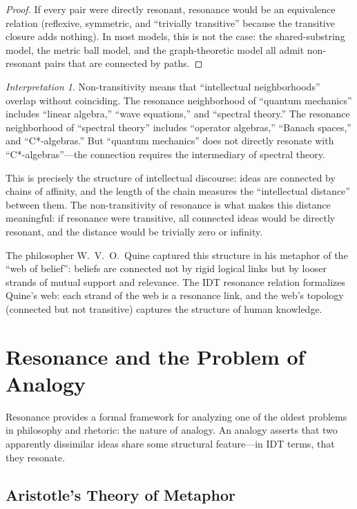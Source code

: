 \documentclass[11pt,openany]{book}
\theoremstyle{definition}
\theoremstyle{plain}
\theoremstyle{remark}
\newtheorem{interpretation}[axiom]{Interpretation}
\begin{document}
\begin{proof}
If every pair were directly resonant, resonance would be an equivalence relation (reflexive, symmetric, and ``trivially transitive'' because the transitive closure adds nothing). In most models, this is not the case: the shared-substring model, the metric ball model, and the graph-theoretic model all admit non-resonant pairs that are connected by paths.
\end{proof}

\begin{interpretation}
Non-transitivity means that ``intellectual neighborhoods'' overlap without coinciding. The resonance neighborhood of ``quantum mechanics'' includes ``linear algebra,'' ``wave equations,'' and ``spectral theory.'' The resonance neighborhood of ``spectral theory'' includes ``operator algebras,'' ``Banach spaces,'' and ``C*-algebras.'' But ``quantum mechanics'' does not directly resonate with ``C*-algebras''---the connection requires the intermediary of spectral theory.

This is precisely the structure of intellectual discourse: ideas are connected by chains of affinity, and the length of the chain measures the ``intellectual distance'' between them. The non-transitivity of resonance is what makes this distance meaningful: if resonance were transitive, all connected ideas would be directly resonant, and the distance would be trivially zero or infinity.

The philosopher W.~V.~O.~Quine captured this structure in his metaphor of the ``web of belief'': beliefs are connected not by rigid logical links but by looser strands of mutual support and relevance. The IDT resonance relation formalizes Quine's web: each strand of the web is a resonance link, and the web's topology (connected but not transitive) captures the structure of human knowledge.
\end{interpretation}

\section{Resonance and the Problem of Analogy}

Resonance provides a formal framework for analyzing one of the oldest problems in philosophy and rhetoric: the nature of analogy. An analogy asserts that two apparently dissimilar ideas share some structural feature---in IDT terms, that they resonate.

\subsection{Aristotle's Theory of Metaphor}
\end{document}
